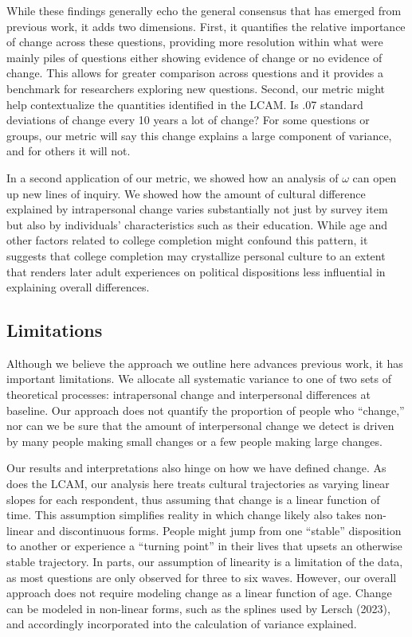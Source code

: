 \documentclass[
  11pt,
]{article}
\begin{document}
While these findings generally echo the general consensus that has
emerged from previous work, it adds two dimensions. First, it quantifies
the relative importance of change across these questions, providing more
resolution within what were mainly piles of questions either showing
evidence of change or no evidence of change. This allows for greater
comparison across questions and it provides a benchmark for researchers
exploring new questions. Second, our metric might help contextualize the
quantities identified in the LCAM. Is .07 standard deviations of change
every 10 years a lot of change? For some questions or groups, our metric
will say this change explains a large component of variance, and for
others it will not.

In a second application of our metric, we showed how an analysis of
\(\omega\) can open up new lines of inquiry. We showed how the amount of
cultural difference explained by intrapersonal change varies
substantially not just by survey item but also by individuals'
characteristics such as their education. While age and other factors
related to college completion might confound this pattern, it suggests
that college completion may crystallize personal culture to an extent
that renders later adult experiences on political dispositions less
influential in explaining overall differences.

\subsection{Limitations}\label{limitations}

Although we believe the approach we outline here advances previous work,
it has important limitations. We allocate all systematic variance to one
of two sets of theoretical processes: intrapersonal change and
interpersonal differences at baseline. Our approach does not quantify
the proportion of people who ``change,'' nor can we be sure that the
amount of interpersonal change we detect is driven by many people making
small changes or a few people making large changes.

Our results and interpretations also hinge on how we have defined
change. As does the LCAM, our analysis here treats cultural trajectories
as varying linear slopes for each respondent, thus assuming that change
is a linear function of time. This assumption simplifies reality in
which change likely also takes non-linear and discontinuous forms.
People might jump from one ``stable'' disposition to another or
experience a ``turning point'' in their lives that upsets an otherwise
stable trajectory. In parts, our assumption of linearity is a limitation
of the data, as most questions are only observed for three to six waves.
However, our overall approach does not require modeling change as a
linear function of age. Change can be modeled in non-linear forms, such
as the splines used by Lersch (2023), and accordingly incorporated into
the calculation of variance explained.
\end{document}
